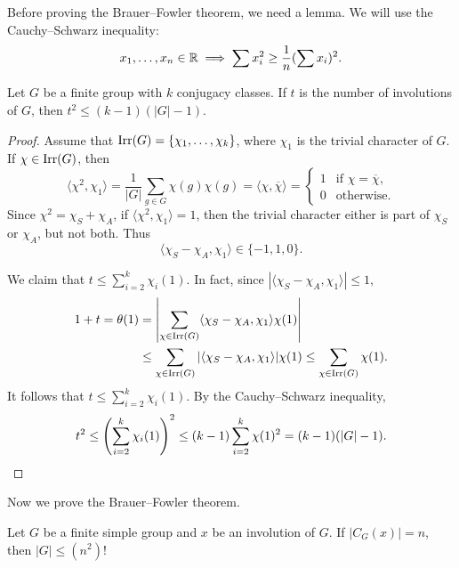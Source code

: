 Before proving the Brauer--Fowler theorem, we
need a lemma. We will use the Cauchy--Schwarz inequality: 
\[
x_1,\dots,x_n\in\mathbb{R}\implies
\sum x_i^2\geq\frac{1}{n}(\sum x_i)^2.
\]

\begin{lemma}
    Let $G$ be a finite group with $k$ conjugacy classes. 
    If $t$ is the number of involutions of $G$, then
    $t^2\leq (k-1)(|G|-1)$. 
\end{lemma}

\begin{proof}
    Assume that $\operatorname{Irr}(G)=\{\chi_1,\dots,\chi_k\}$, where $\chi_1$ is the
    trivial character of $G$. 
    If $\chi\in\operatorname{Irr}(G)$, then 
    \[
        \langle\chi^2,\chi_1\rangle=\frac{1}{|G|}\sum_{g\in G}\chi(g)\chi(g)=\langle\chi,\overline{\chi}\rangle=\begin{cases}
        1 & \text{if $\chi=\overline{\chi}$},\\
        0 & \text{otherwise}.
        \end{cases}
    \]
    Since $\chi^2=\chi_S+\chi_A$, if $\langle\chi^2,\chi_1\rangle=1$, then
    the trivial character either is part of $\chi_S$ or $\chi_A$, but not both. 
    Thus
    \[
    \langle\chi_S-\chi_A,\chi_1\rangle\in\{-1,1,0\}.
    \]
    
    We claim that 
    $t\leq\sum_{i=2}^k\chi_i(1)$. In fact, since 
    $|\langle\chi_S-\chi_A,\chi_1\rangle|\leq 1$, 
    \begin{align*}
        1+t=\theta(1)
        &=\left|\sum_{\chi\in\operatorname{Irr}(G)}\langle\chi_S-\chi_A,\chi_1\rangle\chi(1)\right|\\
        &\leq\sum_{\chi\in\operatorname{Irr}(G)}|\langle\chi_S-\chi_A,\chi_1\rangle|\chi(1)
        \leq\sum_{\chi\in\operatorname{Irr}(G)}\chi(1).
    \end{align*}
    It follows that $t\leq\sum_{i=2}^k\chi_i(1)$. 
    By the Cauchy--Schwarz inequality, 
    \[
        t^2\leq\left(\sum_{i=2}^k\chi_i(1)\right)^2
        \leq(k-1)\sum_{i=2}^k\chi(1)^2=(k-1)(|G|-1).\qedhere
    \]
\end{proof}

Now we prove the Brauer--Fowler theorem. 

\begin{theorem}
    Let $G$ be a finite simple group and $x$ be an involution of $G$. If $|C_G(x)|=n$, then $|G|\leq (n^2)!$	
\end{theorem}

